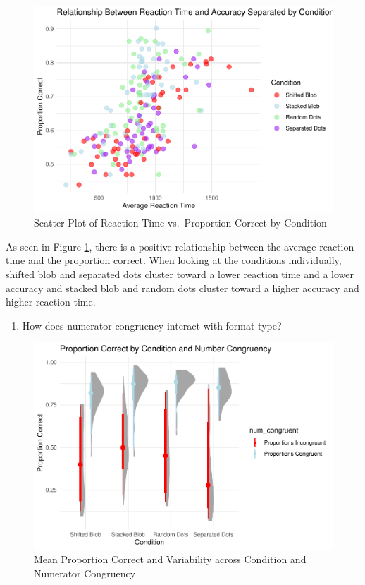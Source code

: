 \documentclass[
  man,floatsintext]{apa6}
\providecommand{\tightlist}{%
  \setlength{\itemsep}{0pt}\setlength{\parskip}{0pt}}
\begin{document}
\begin{figure}
\centering
\includegraphics{Espana_WA11_files/figure-latex/plot-two-1.pdf}
\caption{\label{fig:plot-two}Scatter Plot of Reaction Time vs.~Proportion Correct by Condition}
\end{figure}

As seen in Figure \ref{fig:plot-two}, there is a positive relationship between the average reaction time and the proportion correct. When looking at the conditions individually, shifted blob and separated dots cluster toward a lower reaction time and a lower accuracy and stacked blob and random dots cluster toward a higher accuracy and higher reaction time.

\begin{enumerate}
\def\labelenumi{\arabic{enumi}.}
\setcounter{enumi}{2}
\tightlist
\item
  How does numerator congruency interact with format type?
\end{enumerate}

\begin{figure}
\centering
\includegraphics{Espana_WA11_files/figure-latex/plot-three-1.pdf}
\caption{\label{fig:plot-three}Mean Proportion Correct and Variability across Condition and Numerator Congruency}
\end{figure}
\end{document}
